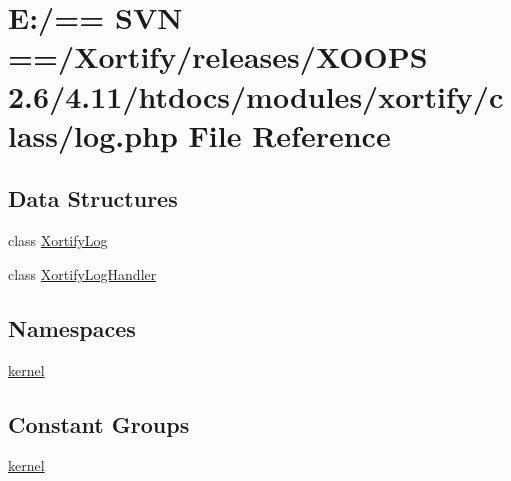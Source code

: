 \hypertarget{log_8php}{\section{E\-:/== S\-V\-N ==/\-Xortify/releases/\-X\-O\-O\-P\-S 2.6/4.11/htdocs/modules/xortify/class/log.php File Reference}
\label{log_8php}
}
\subsection*{Data Structures}
\begin{DoxyCompactItemize}
\item 
class \hyperlink{class_xortify_log}{Xortify\-Log}
\item 
class \hyperlink{class_xortify_log_handler}{Xortify\-Log\-Handler}
\end{DoxyCompactItemize}
\subsection*{Namespaces}
\begin{DoxyCompactItemize}
\item 
\hyperlink{namespacekernel}{kernel}
\end{DoxyCompactItemize}
\subsection*{Constant Groups}
\begin{DoxyCompactItemize}
\item 
\hyperlink{namespacekernel}{kernel}
\end{DoxyCompactItemize}
